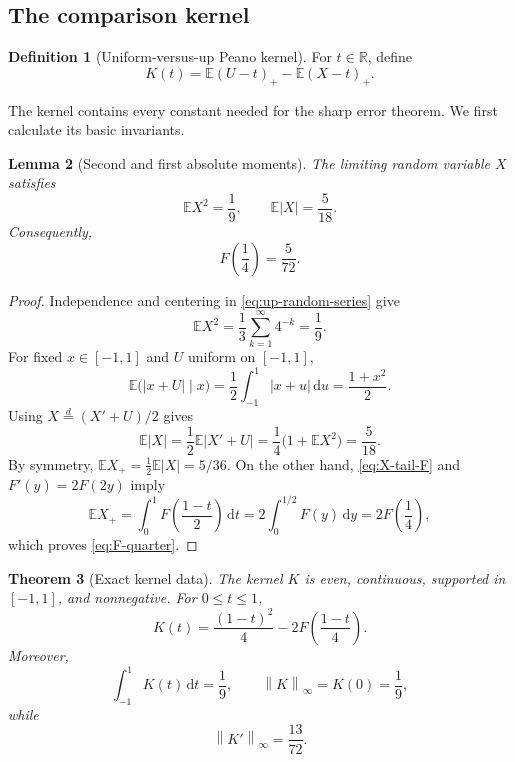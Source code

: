 \documentclass[11pt,oneside]{article}
\newtheorem{theorem}{Theorem}[section]
\newtheorem{lemma}[theorem]{Lemma}
\theoremstyle{definition}
\newtheorem{definition}[theorem]{Definition}
\theoremstyle{remark}
\newcommand{\R}{\mathbb R}
\newcommand{\E}{\mathbb E}
\newcommand{\dd}{\,\mathrm d}
\newcommand{\norm}[1]{\left\lVert#1\right\rVert}
\newcommand{\pos}[1]{\left(#1\right)_{+}}
\begin{document}
\subsection{The comparison kernel}

\begin{definition}[Uniform-versus-up Peano kernel]
\label{def:comparison-kernel}
For $t\in\R$, define
\begin{equation}
 K(t)=\E\pos{U-t}-\E\pos{X-t}.
 \label{eq:K-definition}
\end{equation}
\end{definition}

The kernel contains every constant needed for the sharp error theorem.  We first calculate
its basic invariants.

\begin{lemma}[Second and first absolute moments]
\label{lem:up-moments}
The limiting random variable $X$ satisfies
\begin{equation}
 \E X^2=\frac19,
 \qquad
 \E|X|=\frac5{18}.
 \label{eq:X-moments}
\end{equation}
Consequently,
\begin{equation}
 F\left(\frac14\right)=\frac5{72}.
 \label{eq:F-quarter}
\end{equation}
\end{lemma}

\begin{proof}
Independence and centering in \eqref{eq:up-random-series} give
\[
 \E X^2=\frac13\sum_{k=1}^{\infty}4^{-k}=\frac19.
\]
For fixed $x\in[-1,1]$ and $U$ uniform on $[-1,1]$,
\[
 \E\bigl(|x+U|\mid x\bigr)=\frac12\int_{-1}^{1}|x+u|\dd u
 =\frac{1+x^2}{2}.
\]
Using $X\stackrel d=(X'+U)/2$ gives
\[
 \E|X|=\frac12\E|X'+U|
 =\frac14\bigl(1+\E X^2\bigr)=\frac5{18}.
\]
By symmetry, $\E X_+=\frac12\E|X|=5/36$.  On the other hand,
\eqref{eq:X-tail-F} and $F'(y)=2F(2y)$ imply
\[
 \E X_+=\int_0^1F\left(\frac{1-t}{2}\right)\dd t
 =2\int_0^{1/2}F(y)\dd y=2F\left(\frac14\right),
\]
which proves \eqref{eq:F-quarter}.
\end{proof}

\begin{theorem}[Exact kernel data]
\label{thm:kernel-data}
The kernel $K$ is even, continuous, supported in $[-1,1]$, and nonnegative.  For
$0\le t\le1$,
\begin{equation}
 K(t)=\frac{(1-t)^2}{4}-2F\left(\frac{1-t}{4}\right).
 \label{eq:K-explicit}
\end{equation}
Moreover,
\begin{equation}
 \boxed{\displaystyle
 \int_{-1}^{1}K(t)\dd t=\frac19,
 \qquad
 \norm{K}_\infty=K(0)=\frac19,}
 \label{eq:K-mass-and-max}
\end{equation}
while
\begin{equation}
 \norm{K'}_\infty=\frac{13}{72}.
 \label{eq:Kprime-max}
\end{equation}
\end{theorem}
\end{document}
